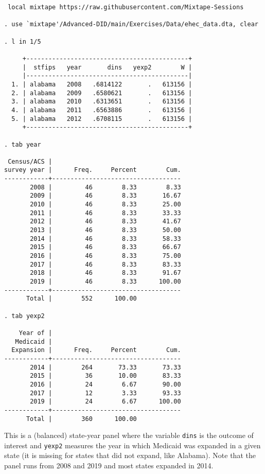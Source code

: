 \documentclass[11pt]{article}
\begin{document}
\begin{lstlisting}
 local mixtape https://raw.githubusercontent.com/Mixtape-Sessions

. use `mixtape'/Advanced-DID/main/Exercises/Data/ehec_data.dta, clear

. l in 1/5

     +--------------------------------------------+
     |  stfips   year       dins   yexp2        W |
     |--------------------------------------------|
  1. | alabama   2008   .6814122       .   613156 |
  2. | alabama   2009   .6580621       .   613156 |
  3. | alabama   2010   .6313651       .   613156 |
  4. | alabama   2011   .6563886       .   613156 |
  5. | alabama   2012   .6708115       .   613156 |
     +--------------------------------------------+

. tab year

 Census/ACS |
survey year |      Freq.     Percent        Cum.
------------+-----------------------------------
       2008 |         46        8.33        8.33
       2009 |         46        8.33       16.67
       2010 |         46        8.33       25.00
       2011 |         46        8.33       33.33
       2012 |         46        8.33       41.67
       2013 |         46        8.33       50.00
       2014 |         46        8.33       58.33
       2015 |         46        8.33       66.67
       2016 |         46        8.33       75.00
       2017 |         46        8.33       83.33
       2018 |         46        8.33       91.67
       2019 |         46        8.33      100.00
------------+-----------------------------------
      Total |        552      100.00

. tab yexp2

    Year of |
   Medicaid |
  Expansion |      Freq.     Percent        Cum.
------------+-----------------------------------
       2014 |        264       73.33       73.33
       2015 |         36       10.00       83.33
       2016 |         24        6.67       90.00
       2017 |         12        3.33       93.33
       2019 |         24        6.67      100.00
------------+-----------------------------------
      Total |        360      100.00

\end{lstlisting}
This is a (balanced) state-year panel where the variable \texttt{dins} is the outcome of interest and \texttt{yexp2} measures the year in which Medicaid was expanded in a given state (it is missing for states that did not expand, like Alabama). Note that the panel runs from 2008 and 2019  and most states expanded in 2014. 
\end{document}
